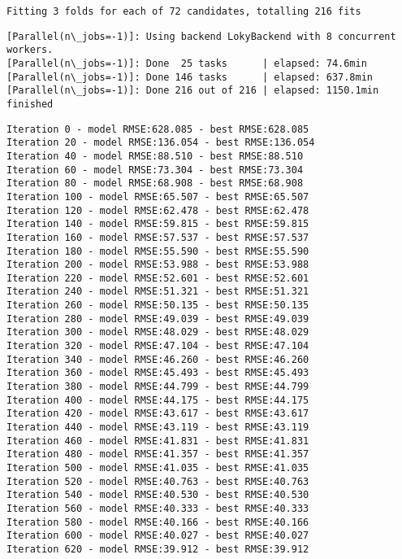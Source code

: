\documentclass[11pt]{article}
\begin{document}
    \begin{Verbatim}[commandchars=\\\{\},fontsize=\small]
Fitting 3 folds for each of 72 candidates, totalling 216 fits

    \end{Verbatim}

    \begin{Verbatim}[commandchars=\\\{\},fontsize=\small]
[Parallel(n\_jobs=-1)]: Using backend LokyBackend with 8 concurrent workers.
[Parallel(n\_jobs=-1)]: Done  25 tasks      | elapsed: 74.6min
[Parallel(n\_jobs=-1)]: Done 146 tasks      | elapsed: 637.8min
[Parallel(n\_jobs=-1)]: Done 216 out of 216 | elapsed: 1150.1min finished
    \end{Verbatim}
    \begin{Verbatim}[commandchars=\\\{\},fontsize=\small]
Iteration 0 - model RMSE:628.085 - best RMSE:628.085
Iteration 20 - model RMSE:136.054 - best RMSE:136.054
Iteration 40 - model RMSE:88.510 - best RMSE:88.510
Iteration 60 - model RMSE:73.304 - best RMSE:73.304
Iteration 80 - model RMSE:68.908 - best RMSE:68.908
Iteration 100 - model RMSE:65.507 - best RMSE:65.507
Iteration 120 - model RMSE:62.478 - best RMSE:62.478
Iteration 140 - model RMSE:59.815 - best RMSE:59.815
Iteration 160 - model RMSE:57.537 - best RMSE:57.537
Iteration 180 - model RMSE:55.590 - best RMSE:55.590
Iteration 200 - model RMSE:53.988 - best RMSE:53.988
Iteration 220 - model RMSE:52.601 - best RMSE:52.601
Iteration 240 - model RMSE:51.321 - best RMSE:51.321
Iteration 260 - model RMSE:50.135 - best RMSE:50.135
Iteration 280 - model RMSE:49.039 - best RMSE:49.039
Iteration 300 - model RMSE:48.029 - best RMSE:48.029
Iteration 320 - model RMSE:47.104 - best RMSE:47.104
Iteration 340 - model RMSE:46.260 - best RMSE:46.260
Iteration 360 - model RMSE:45.493 - best RMSE:45.493
Iteration 380 - model RMSE:44.799 - best RMSE:44.799
Iteration 400 - model RMSE:44.175 - best RMSE:44.175
Iteration 420 - model RMSE:43.617 - best RMSE:43.617
Iteration 440 - model RMSE:43.119 - best RMSE:43.119
Iteration 460 - model RMSE:41.831 - best RMSE:41.831
Iteration 480 - model RMSE:41.357 - best RMSE:41.357
Iteration 500 - model RMSE:41.035 - best RMSE:41.035
Iteration 520 - model RMSE:40.763 - best RMSE:40.763
Iteration 540 - model RMSE:40.530 - best RMSE:40.530
Iteration 560 - model RMSE:40.333 - best RMSE:40.333
Iteration 580 - model RMSE:40.166 - best RMSE:40.166
Iteration 600 - model RMSE:40.027 - best RMSE:40.027
Iteration 620 - model RMSE:39.912 - best RMSE:39.912

\end{Verbatim}
\end{document}
